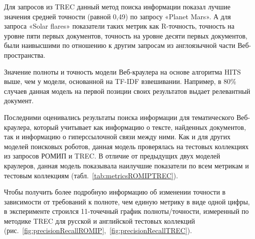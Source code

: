 Для запросов из TREC данный метод поиска информации показал лучшие значения средней точности (равной 0,49) по запросу «Planet Mars». А для запроса «Solar flares» показатели таких метрик как R-точность, точность на уровне пяти первых документов, точность на уровне десяти первых документов, были наивысшими по отношению к другим запросам из англоязычной части Веб-пространства.

Значение полноты и точность модели Веб-краулера на основе алгоритма HITS выше, чем у модели, основанной на TF-IDF взвешивании. Например, в 80\% случаев данная модель на первой позиции своих результатов выдает релевантный документ.

Последними оценивались результаты поиска информации для тематического Веб-краулера, который учитывает как информацию о тексте, найденных документов, так и информацию о гиперссылочной связи между ними. Как и для других моделей поисковых роботов, данная модель проверялась на тестовых коллекциях из запросов РОМИП и TREC. В отличие от предыдущих двух моделей краулеров, данная модель показывала наилучшие показатели по всем метрикам и тестовым коллекциям (табл.~\cref{tab:metricsROMIPTREC}).

Чтобы получить более подробную информацию об изменении точности в зависимости от требований к полноте, чем единую метрику в виде одной цифры, в эксперименте строился 11-точечный график полноты/точности, измеренный по методике TREC для русской и английской тестовых коллекций (рис.~\cref{fig:precisionRecallROMIP},~\cref{fig:precisionRecallTREC}).

\begin{figure}[ht]
	\caption[Этот текст попадает в названия рисунков в списке рисунков]{}\label{fig:precisionRecallROMIPTREC}
\end{figure}

